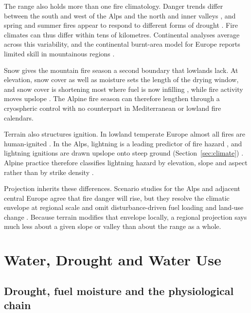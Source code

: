 \documentclass[11pt,a4paper]{article}
\begin{document}
The range also holds more than one fire climatology. Danger trends differ between the south and west of the Alps and the north and inner valleys \citep{wastl_recent_2012}, and spring and summer fires appear to respond to different forms of drought \citep{ruffault_extreme_2018, beloiu_climatedriven_2026}. Fire climates can thus differ within tens of kilometres. Continental analyses average across this variability, and the continental burnt-area model for Europe reports limited skill in mountainous regions \citep{forrest_understanding_2024}.

Snow gives the mountain fire season a second boundary that lowlands lack. At elevation, snow cover as well as moisture sets the length of the drying window, and snow cover is shortening most where fuel is now infilling \citep{rangwala_climate_2012, frei_evidence_2023, pede_mountain_2022}, while fire activity moves upslope \citep{beloiu_climatedriven_2026}. The Alpine fire season can therefore lengthen through a cryospheric control with no counterpart in Mediterranean or lowland fire calendars.

Terrain also structures ignition. In lowland temperate Europe almost all fires are human-ignited \citep{stoof_temperate_2024}. In the Alps, lightning is a leading predictor of fire hazard \citep{gerberding_mapping_2025}, and lightning ignitions are drawn upslope onto steep ground (Section~\ref{sec:climate}) \citep{conedera_lightninginduced_2006}. Alpine practice therefore classifies lightning hazard by elevation, slope and aspect rather than by strike density \citep{muller_towards_2020}.

Projection inherits these differences. Scenario studies for the Alps and adjacent central Europe agree that fire danger will rise, but they resolve the climatic envelope at regional scale and omit disturbance-driven fuel loading and land-use change \citep{gerberding_mapping_2025, miller_climate_2024}. Because terrain modifies that envelope locally, a regional projection says much less about a given slope or valley than about the range as a whole.

\section{Water, Drought and Water Use}
\label{sec:water}

\subsection{Drought, fuel moisture and the physiological chain}
\end{document}
